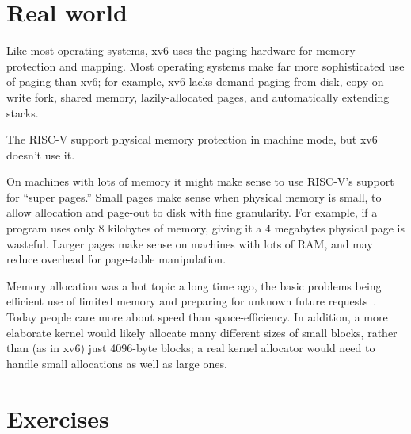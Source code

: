 \section{Real world}

Like most operating systems, xv6 uses the paging hardware
for memory protection and mapping.
Most operating systems make far more sophisticated
use of paging than xv6; for example, xv6 lacks demand
paging from disk, copy-on-write fork, shared memory,
lazily-allocated pages,
and automatically extending stacks.

The RISC-V support physical memory protection in machine mode, but xv6 doesn't use it.

On machines with lots of memory
it might make sense to use
RISC-V's support for ``super pages.''
Small pages make sense
when physical memory is small, to allow allocation and page-out to disk
with fine granularity.
For example, if a program
uses only 8 kilobytes of memory, giving it a 4 megabytes physical page is wasteful.
Larger pages make sense on machines with lots of RAM,
and may reduce overhead for page-table manipulation.

Memory allocation was a hot topic a long time ago, the basic problems being
efficient use of limited memory and
preparing for unknown future requests~\cite{knuth}.  Today people care more about speed than
space-efficiency.  In addition, a more elaborate kernel
would likely allocate many different sizes of small blocks,
rather than (as in xv6) just 4096-byte blocks;
a real kernel
allocator would need to handle small allocations as well as large
ones.
\section{Exercises}

